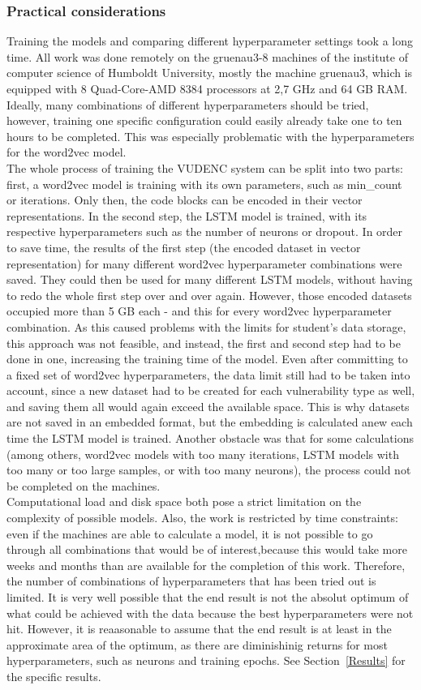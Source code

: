 \documentclass[
a4paper,
pagesize,
pdftex,
12pt,
twoside, %
BCOR=5mm, %
ngerman,
fleqn,
final,
]{scrartcl}
\begin{document}
	\subsubsection{Practical considerations}
	Training the models and comparing different hyperparameter settings took a long time. All work was done remotely on the gruenau3-8 machines of the institute of computer science of Humboldt University, mostly the machine gruenau3, which is equipped with 8 Quad-Core-AMD 8384 processors at 2,7 GHz and 64 GB RAM. Ideally, many combinations of different hyperparameters should be tried, however, training one specific configuration could easily already take one to ten hours to be completed. This was especially problematic with the hyperparameters for the word2vec model.\\
	The whole process of training the VUDENC system can be split into two parts: first, a word2vec model is training with its own parameters, such as min\_count or iterations. Only then, the code blocks can be encoded in their vector representations. In the second step, the LSTM model is trained, with its respective hyperparameters such as the number of neurons or dropout. In order to save time, the results of the first step (the encoded dataset in vector representation) for many different word2vec hyperparameter combinations were saved. They could then be used for many different LSTM models, without having to redo the whole first step over and over again. However, those encoded datasets occupied more than 5 GB each - and this for every word2vec hyperparameter combination. As this caused problems with the limits for student's data storage, this approach was not feasible, and instead, the first and second step had to be done in one, increasing the training time of the model. Even after committing to a fixed set of word2vec hyperparameters, the data limit still had to be taken into account, since a new dataset had to be created for each vulnerability type as well, and saving them all would again exceed the available space. This is why datasets are not saved in an embedded format, but the embedding is calculated anew each time the LSTM model is trained. Another obstacle was that for some calculations (among others, word2vec models with too many iterations, LSTM models with too many or too large samples, or with too many neurons), the process could not be completed on the machines.\\
	Computational load and disk space both pose a strict limitation on the complexity of possible models. Also, the work is restricted by time constraints: even if the machines are able to calculate a model, it is not possible to go through all combinations that would be of interest,because this would take more weeks and months than are available for the completion of this work. Therefore, the number of combinations of hyperparameters that has been tried out is limited. It is very well possible that the end result is not the absolut optimum of what could be achieved with the data because the best hyperparameters were not hit. However, it is reaasonable to assume that the end result is at least in the approximate area of the optimum, as there are diminishinig returns for most hyperparameters, such as neurons and training epochs. See Section~\ref{Results} for the specific results. 
		
\end{document}
